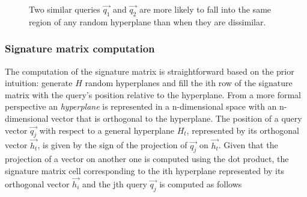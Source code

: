 \begin{figure}[h]
\caption{\normalfont Two similar queries $\vec{q_1}$ and $\vec{q_2}$ are more likely to fall into the same region of any random hyperplane than when they are dissimilar.} 
\label{fig:random_planes}
\end{figure}

\subsubsection{Signature matrix computation} 
The computation of the signature matrix is straightforward based on the prior intuition: generate $H$ random hyperplanes and fill the ith row of the signature matrix with the query's position relative to the hyperplane. From a more formal perspective an \emph{hyperplane} is represented in a n-dimensional space with an n-dimensional vector that is orthogonal to the hyperplane. The position of a query vector $\vec{q_j}$ with respect to a general hyperplane $H_t$, represented by its orthogonal vector $\vec{h_t}$, is given by the sign of the projection of $\vec{q_j}$ on $\vec{h_t}$. Given that the projection of a vector on another one is computed using the dot product, the signature matrix cell corresponding to the ith hyperplane represented by its orthogonal vector $\vec{h_i}$ and the jth query $\vec{q_j}$ is computed as follows

